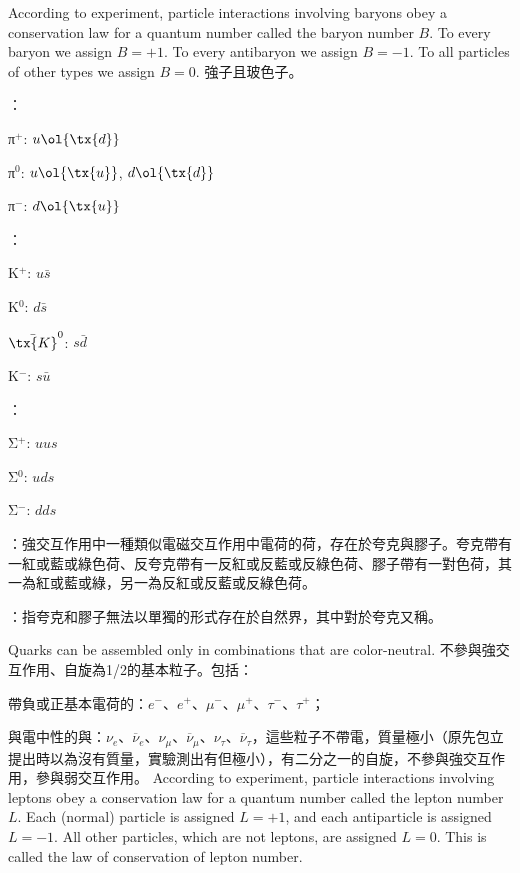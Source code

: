 \documentclass[a4paper,12pt]{article}
\begin{document}
According to experiment, particle interactions involving baryons obey a conservation law for a quantum number called the baryon number $B$. To every baryon we assign $B = +1$. To every antibaryon we assign $B = -1$. To all particles of other types we assign $B = 0$.
強子且玻色子。
\bit
\item{}：
\bit
\item π$^+$: $u\ol{\tx{d}}$
\item π$^0$: $u\ol{\tx{u}}$, $d\ol{\tx{d}}$
\item π$^-$: $d\ol{\tx{u}}$
\eit
\item{}：
\bit
\item K$^+$: $u\bar{s}$
\item K$^0$: $d\bar{s}$
\item $\bar{\tx{K}}^0$: $s\bar{d}$
\item K$^-$: $s\bar{u}$
\eit
\item{}：
\bit
\item Σ$^+$: $uus$
\item Σ$^0$: $uds$
\item Σ$^-$: $dds$
\eit
\eit
{}
\bit
\item {}：強交互作用中一種類似電磁交互作用中電荷的荷，存在於夸克與膠子。夸克帶有一紅或藍或綠色荷、反夸克帶有一反紅或反藍或反綠色荷、膠子帶有一對色荷，其一為紅或藍或綠，另一為反紅或反藍或反綠色荷。
\item {}：指夸克和膠子無法以單獨的形式存在於自然界，其中對於夸克又稱。
\item Quarks can be assembled only in combinations that are color-neutral.
\eit
{}
不參與強交互作用、自旋為1/2的基本粒子。包括：
\bit
\item 帶負或正基本電荷的：$e^-$、$e^+$、$\mu^-$、$\mu^+$、$\tau^-$、$\tau^+$；
\item 與電中性的與：$\nu_e$、$\overline{\nu}_e$、$\nu_\mu$、$\overline{\nu}_\mu$、$\nu_\tau$、$\overline{\nu}_\tau$，這些粒子不帶電，質量極小（原先包立提出時以為沒有質量，實驗測出有但極小），有二分之一的自旋，不參與強交互作用，參與弱交互作用。
\eit
According to experiment, particle interactions involving leptons obey a conservation law for a quantum number called the lepton number $L$. Each (normal) particle is assigned $L = +1$, and each antiparticle is assigned  $L = -1$. All other particles, which are not leptons, are assigned $L = 0$. This is called the law of conservation of lepton number.
\end{document}
